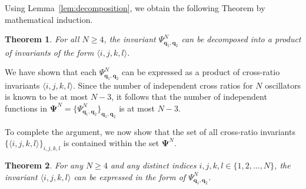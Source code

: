 \documentclass[
amsmath,amssymb,
]{revtex4-2}
\newtheorem{theorem}{Theorem}
\begin{document}
Using Lemma~\ref{lem:decomposition}, we obtain the following Theorem by mathematical induction.
\begin{theorem}
\label{thm:atmost}
    For all $N \geq 4$, the invariant $\Psi^N_{\bm{q}_1, \bm{q}_2}$ can be decomposed into a product of  
    invariants of the form $\langle i,j,k,l\rangle$. 
\end{theorem}

We have shown that each $\Psi^N_{\bm{q}_1, \bm{q}_2}$ can be expressed as a product of cross-ratio invariants $\langle i,j,k,l\rangle$. Since the number of independent cross ratios for $N$ oscillators is known to be at most $N - 3$, it follows that the number of independent functions in $\bm{\Psi}^N = \{\Psi^N_{\bm{q}_1, \bm{q}_2}\}_{\bm{q}_1, \bm{q}_2}$ is at most $N - 3$.

To complete the argument, we now show that the set of all cross-ratio invariants $\{\langle i,j,k,l\rangle\}_{i,j,k,l}$ is contained within the set $\bm{\Psi}^N$.

\begin{theorem}
    \label{thm:atleast}
    For any $N \geq 4$ and any distinct indices $i, j, k, l \in \{1, 2, \ldots, N\}$, the invariant $\langle i,j,k,l\rangle$ can be expressed in the form of $\Psi^N_{\bm{q}_1, \bm{q}_2}$.
\end{theorem}
\end{document}
